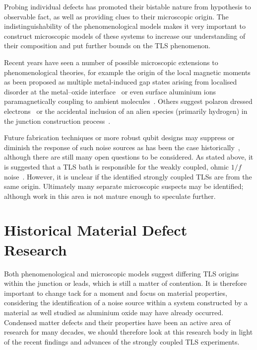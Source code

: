 Probing individual defects has promoted their bistable nature from hypothesis to observable fact, as well as providing clues to their microscopic origin.
The indistinguishability of the phenomenological models makes it very important to construct microscopic models of these systems to increase our understanding of their composition and put further bounds on the TLS phenomenon.

Recent years have seen a number of possible microscopic extensions to phenomenological theories, for example the origin of the local magnetic moments as been proposed as multiple metal-induced gap states arising from localised disorder at the metal--oxide interface~\cite{Choi2009} or even surface aluminium ions paramagnetically coupling to ambient molecules~\cite{Lee2014}.
Others suggest polaron dressed electrons~\cite{Agarwal2013} or the accidental inclusion of an alien species (primarily hydrogen) in the junction construction process~\cite{Jameson2011, Holder2013, Gordon2014}.

Future fabrication techniques or more robust qubit designs may suppress or diminish the response of such noise sources as has been the case historically~\cite{Vion2002, Martinis2005, Koch2007, Schreier2008, Houck2008}, although there are still many open questions to be considered.
As stated above, it is suggested that a TLS bath is responsible for the weakly coupled, ohmic $1/f$ noise~\cite{Dutta1981}.
However, it is unclear if the identified strongly coupled TLSs are from the same origin.
Ultimately many separate microscopic suspects may be identified; although work in this area is not mature enough to speculate further.

\section{Historical Material Defect Research}

Both phenomenological and microscopic models suggest differing TLS origins within the junction or leads, which is still a matter of contention.
It is therefore important to change tack for a moment and focus on material properties, considering the identification of a noise source within a system constructed by a material as well studied as aluminium oxide may have already occurred.
Condensed matter defects and their properties have been an active area of research for many decades, we should therefore look at this research body in light of the recent findings and advances of the strongly coupled TLS experiments.

